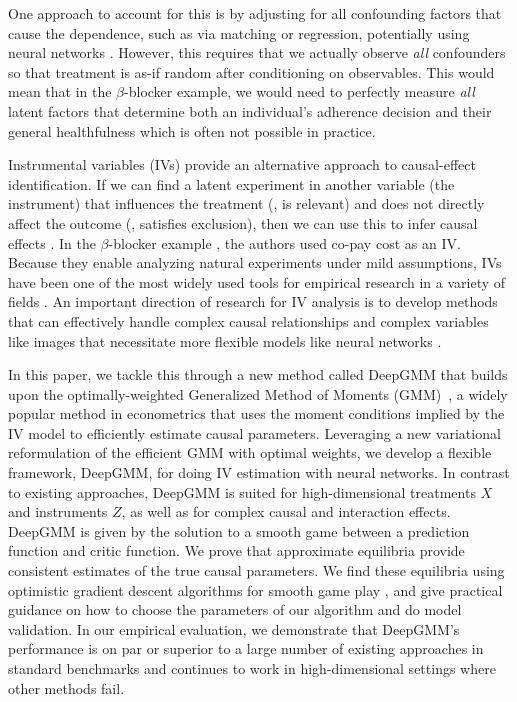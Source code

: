 \documentclass{article}
\theoremstyle{plain}
\theoremstyle{definition}
\begin{document}
One approach to account for this is by adjusting for all confounding factors that cause the dependence, such as via matching \cite{rubin1973matching,kallus2016generalized} or regression, potentially using neural networks \citep{shalit2017estimating,johansson2018learning,kallus2018deepmatch}.
However, this requires that we actually observe \emph{all} confounders so that treatment is as-if random after conditioning on observables. This would mean that in the $\beta$-blocker example, we would need to perfectly measure \emph{all} latent factors that determine both an individual's adherence decision and their general healthfulness which is often not possible in practice.

Instrumental variables (IVs) provide an alternative approach to causal-effect identification. If we can find a latent experiment in another variable (the instrument) that influences the treatment (\ie, is relevant) and does not directly affect the outcome (\ie, satisfies exclusion), then we can use this to infer causal effects \citep{angrist2008mostly}.
In the $\beta$-blocker example \citep{cole2006drug}, the authors used co-pay cost as an IV.
Because they enable analyzing natural experiments under mild assumptions, IVs have been one of the most widely used tools for empirical research in a variety of fields \citep{angrist2001instrumental}. 
An important direction of research for IV analysis is to develop methods that can effectively handle complex causal relationships and complex variables like images that necessitate more flexible models like neural networks \citep{hartford2017deep,lewis2018adversarial}. 
%

In this paper, we tackle this through a new method called DeepGMM that builds upon the optimally-weighted Generalized Method of Moments (GMM)~\cite{hansen1982large}, a widely popular method in econometrics that uses the moment conditions implied by the IV model to {efficiently} estimate causal parameters.
%
%
%
%
%
%
%
%
Leveraging a new variational reformulation of the efficient GMM with optimal weights, we develop a flexible framework, DeepGMM, for doing IV estimation with neural networks.
%
In contrast to existing approaches, DeepGMM is suited for high-dimensional treatments $X$ and instruments $Z$, as well as for complex causal and interaction effects. 
DeepGMM is given by the solution to a smooth game between a prediction function and critic function. We prove that approximate equilibria provide consistent estimates of the true causal parameters. We find these equilibria using optimistic gradient descent algorithms for smooth game play \citep{daskalakis2017training}, and give practical guidance on how to choose the parameters of our algorithm and do model validation. In our empirical evaluation, we demonstrate that DeepGMM's performance is on par or superior to a large number of existing approaches in standard benchmarks and continues to work in high-dimensional settings where other methods fail.
\end{document}

